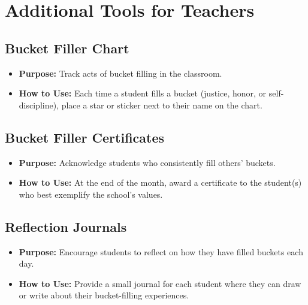 \documentclass[11pt]{article}
\begin{document}
\section{Additional Tools for Teachers}
\label{sec:org0957dfd}
\subsection{Bucket Filler Chart}
\label{sec:orgd885733}
\begin{itemize}
\item \textbf{\textbf{Purpose:}} Track acts of bucket filling in the classroom.
\item \textbf{\textbf{How to Use:}} Each time a student fills a bucket (justice, honor, or self-discipline), place a star or sticker next to their name on the chart.
\end{itemize}

\subsection{Bucket Filler Certificates}
\label{sec:org257a511}
\begin{itemize}
\item \textbf{\textbf{Purpose:}} Acknowledge students who consistently fill others’ buckets.
\item \textbf{\textbf{How to Use:}} At the end of the month, award a certificate to the student(s) who best exemplify the school’s values.
\end{itemize}

\subsection{Reflection Journals}
\label{sec:org076fc7f}
\begin{itemize}
\item \textbf{\textbf{Purpose:}} Encourage students to reflect on how they have filled buckets each day.
\item \textbf{\textbf{How to Use:}} Provide a small journal for each student where they can draw or write about their bucket-filling experiences.
\end{itemize}
\end{document}
